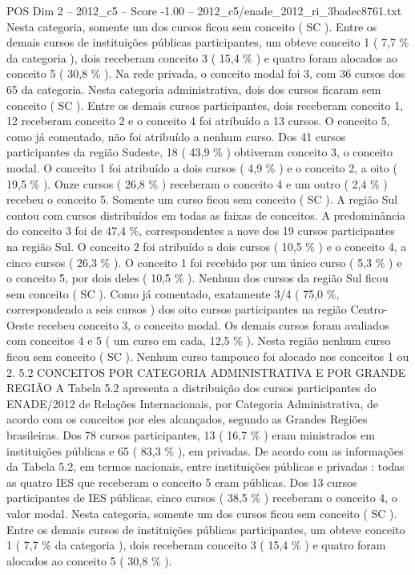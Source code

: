 \begin{textsample}{POS Dim 2 – 2012\_c5 – Score -1.00 – 2012\_c5/enade\_2012\_ri\_3badec8761.txt}
Nesta categoria, somente um dos cursos ficou sem conceito ( SC ).
Entre os demais cursos de instituições públicas participantes, um obteve conceito 1 ( 7,7 \% da categoria ), dois receberam conceito 3 ( 15,4 \% ) e quatro foram alocados ao conceito 5 ( 30,8 \% ).
Na rede privada, o conceito modal foi 3, com 36 cursos dos 65 da categoria.
Nesta categoria administrativa, dois dos cursos ficaram sem conceito ( SC ).
Entre os demais cursos participantes, dois receberam conceito 1, 12 receberam conceito 2 e o conceito 4 foi atribuído a 13 cursos.
O conceito 5, como já comentado, não foi atribuído a nenhum curso.
Dos 41 cursos participantes da região Sudeste, 18 ( 43,9 \% ) obtiveram conceito 3, o conceito modal.
O conceito 1 foi atribuído a dois cursos ( 4,9 \% ) e o conceito 2, a oito ( 19,5 \% ).
Onze cursos ( 26,8 \% ) receberam o conceito 4 e um outro ( 2,4 \% ) recebeu o conceito 5.
Somente um curso ficou sem conceito ( SC ).
A região Sul contou com cursos distribuídos em todas as faixas de conceitos.
A predominância do conceito 3 foi de 47,4 \%, correspondentes a nove dos 19 cursos participantes na região Sul.
O conceito 2 foi atribuído a dois cursos ( 10,5 \% ) e o conceito 4, a cinco cursos ( 26,3 \% ).
O conceito 1 foi recebido por um único curso ( 5,3 \% ) e o conceito 5, por dois deles ( 10,5 \% ).
Nenhum dos cursos da região Sul ficou sem conceito ( SC ).
Como já comentado, exatamente 3/4 ( 75,0 \%, correspondendo a seis cursos ) dos oito cursos participantes na região Centro-Oeste recebeu conceito 3, o conceito modal.
Os demais cursos foram avaliados com conceitos 4 e 5 ( um curso em cada, 12,5 \% ).
Nesta região nenhum curso ficou sem conceito ( SC ).
Nenhum curso tampouco foi alocado nos conceitos 1 ou 2. 5.2 CONCEITOS POR CATEGORIA ADMINISTRATIVA E POR GRANDE REGIÃO A Tabela 5.2 apresenta a distribuição dos cursos participantes do ENADE/2012 de Relações Internacionais, por Categoria Administrativa, de acordo com os conceitos por eles alcançados, segundo as Grandes Regiões brasileiras.
Dos 78 cursos participantes, 13 ( 16,7 \% ) eram ministrados em instituições públicas e 65 ( 83,3 \% ), em privadas.
De acordo com as informações da Tabela 5.2, em termos nacionais, entre instituições públicas e privadas : todas as quatro IES que receberam o conceito 5 eram públicas.
Dos 13 cursos participantes de IES públicas, cinco cursos ( 38,5 \% ) receberam o conceito 4, o valor modal.
Nesta categoria, somente um dos cursos ficou sem conceito ( SC ).
Entre os demais cursos de instituições públicas participantes, um obteve conceito 1 ( 7,7 \% da categoria ), dois receberam conceito 3 ( 15,4 \% ) e quatro foram alocados ao conceito 5 ( 30,8 \% ).

\end{textsample}
